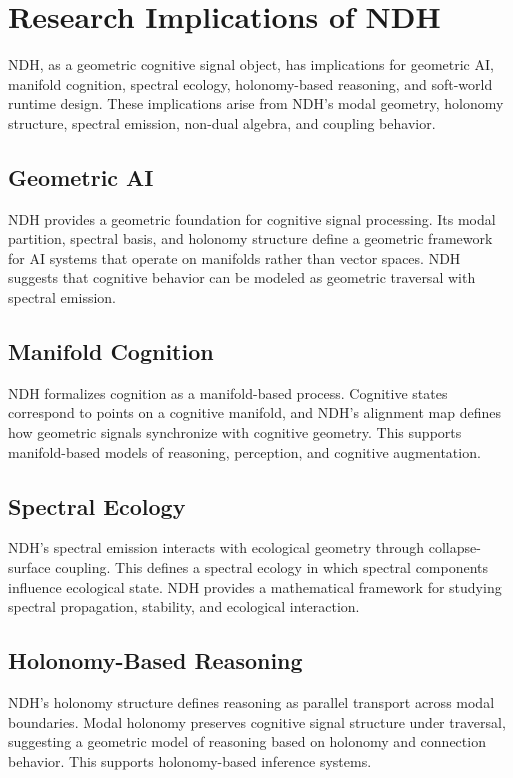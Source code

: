 \section{Research Implications of NDH}
\label{sec:ndh-research-implications}

NDH, as a geometric cognitive signal object, has implications for geometric AI,
manifold cognition, spectral ecology, holonomy-based reasoning, and soft-world
runtime design. These implications arise from NDH's modal geometry, holonomy
structure, spectral emission, non-dual algebra, and coupling behavior.

\subsection{Geometric AI}

NDH provides a geometric foundation for cognitive signal processing. Its modal
partition, spectral basis, and holonomy structure define a geometric framework
for AI systems that operate on manifolds rather than vector spaces. NDH suggests
that cognitive behavior can be modeled as geometric traversal with spectral
emission.

\subsection{Manifold Cognition}

NDH formalizes cognition as a manifold-based process. Cognitive states correspond
to points on a cognitive manifold, and NDH's alignment map defines how geometric
signals synchronize with cognitive geometry. This supports manifold-based models
of reasoning, perception, and cognitive augmentation.

\subsection{Spectral Ecology}

NDH's spectral emission interacts with ecological geometry through collapse-surface
coupling. This defines a spectral ecology in which spectral components influence
ecological state. NDH provides a mathematical framework for studying spectral
propagation, stability, and ecological interaction.

\subsection{Holonomy-Based Reasoning}

NDH's holonomy structure defines reasoning as parallel transport across modal
boundaries. Modal holonomy preserves cognitive signal structure under traversal,
suggesting a geometric model of reasoning based on holonomy and connection
behavior. This supports holonomy-based inference systems.

